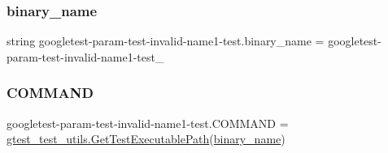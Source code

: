 \subsubsection{\texorpdfstring{binary\_name}{binary\_name}}
{\footnotesize\ttfamily string googletest-\/param-\/test-\/invalid-\/name1-\/test.\+binary\+\_\+name = \textquotesingle{}googletest-\/param-\/test-\/invalid-\/name1-\/test\+\_\+\textquotesingle{}}

\mbox{\label{namespacegoogletest-param-test-invalid-name1-test_a92131bc06f98ffc4aa4a6effd87da6fd}} 
\subsubsection{\texorpdfstring{COMMAND}{COMMAND}}
{\footnotesize\ttfamily googletest-\/param-\/test-\/invalid-\/name1-\/test.\+C\+O\+M\+M\+A\+ND = \mbox{\hyperlink{namespacegtest__test__utils_a89ed3717984a80ffbb7a9c92f71b86a2}{gtest\+\_\+test\+\_\+utils.\+Get\+Test\+Executable\+Path}}(\mbox{\hyperlink{namespacegoogletest-param-test-invalid-name1-test_a073018906c94da733e54cf4c457bec29}{binary\+\_\+name}})}

